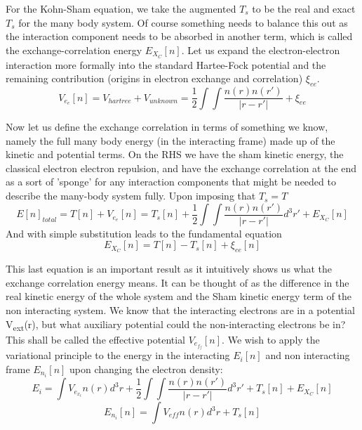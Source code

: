 \documentclass[12pt]{article}
\begin{document}
For the Kohn-Sham equation, we take the augmented $T_s$ to be the real and exact $T_s$ for the many body system. Of course something needs to balance this out as the interaction component needs to be absorbed in another term, which is called the exchange-correlation energy $E_X_C[n]$. Let us expand the electron-electron interaction more formally into the standard Hartee-Fock potential and the remaining contribution (origins in electron exchange and correlation) $\xi_{ee}$.
\begin{equation} \label{2.6} \tag{2.6}
V_e_e[n] =V_{hartree}+V_{unknown}=\frac{1}{2}\int \int \frac{n(r)n(r')}{|r-r'|} + \xi_{ee}
\end{equation}


Now let us define the exchange correlation in terms of something we know, namely the full many body energy (in the interacting frame) made up of the kinetic and potential terms. On the RHS we have the sham kinetic energy, the classical electron electron repulsion, and have the exchange correlation at the end as a sort of 'sponge' for any interaction components that might be needed to describe the many-body system fully. Upon imposing that $T_s=T$
\begin{equation} \label{2.6} \tag{2.6}
E[n]_{total}=T[n]+V_e_e[n] = T_s[n] + \frac{1}{2}\int \int \frac{n(r)n(r')}{|r-r'|}d^3 r' + E_X_C[n]
\end{equation}
And with simple substitution leads to the fundamental equation
\begin{equation} \label{2.7} \tag{2.7}
E_X_C[n]=T[n] -T_s[n] + \xi_{ee}[n]
\end{equation}

This last equation is an important result as it intuitively shows us what the exchange correlation energy means. It can be thought of as the difference in the real kinetic energy of the whole system and the Sham kinetic energy term of the non interacting system. We know that the interacting electrons are in a potential V\textsubscript{ext}(r), but what auxiliary potential could the non-interacting electrons be in? This shall be called the effective potential $V_e_f_f[n]$. We wish to apply the variational principle to the energy in the interacting $E_i[n]$ and non interacting frame $E_n_i[n]$ upon changing the electron density:
\begin{equation} \label{2.8} \tag{2.8}
E_i=\int V_e_x_tn(r)d^3r + \frac{1}{2}\int \int \frac{n(r)n(r')}{|r-r'|}d^3 r' + T_s[n]+E_X_C[n]
\end{equation}
\begin{equation} \label{2.9} \tag{2.9}
E_n_i[n]= \int V_{eff} n(r)d^3r + T_s[n]
\end{equation}
\end{document}
